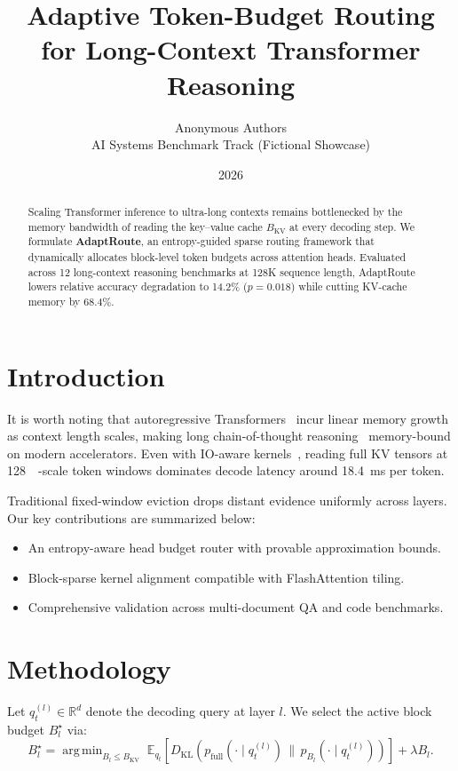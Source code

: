 \documentclass[11pt]{article}
\title{Adaptive Token-Budget Routing for Long-Context Transformer Reasoning}
\author{Anonymous Authors\\AI Systems Benchmark Track (Fictional Showcase)}
\date{2026}
\newcommand{\R}{\mathbb{R}}
\newcommand{\kvbudget}{B_{\mathrm{KV}}}
\newcommand{\argmin}{\operatorname{arg\,min}}
\begin{document}
\maketitle

\begin{abstract}
Scaling Transformer inference to ultra-long contexts remains bottlenecked by the memory bandwidth of reading the key--value cache $\kvbudget$ at every decoding step. We formulate \textbf{AdaptRoute}, an entropy-guided sparse routing framework that dynamically allocates block-level token budgets across attention heads. Evaluated across 12 long-context reasoning benchmarks at 128K sequence length, AdaptRoute lowers relative accuracy degradation to 14.2\% ($p = 0.018$) while cutting KV-cache memory by 68.4\%.
\end{abstract}

\section{Introduction}
\label{sec:intro}

\indent It is worth noting that autoregressive Transformers~\cite{vaswani2017attention} incur linear memory growth as context length scales, making long chain-of-thought reasoning~\cite{wei2022cot} memory-bound on modern accelerators. Even with IO-aware kernels~\cite{dao2022flashattention}, reading full KV tensors at \SI{128}{\kilo\byte}-scale token windows dominates decode latency around \SI{18.4}{\milli\second} per token.

\noindent Traditional fixed-window eviction drops distant evidence uniformly across layers. Our key contributions are summarized below:
\begin{itemize}
  \item An entropy-aware head budget router with provable approximation bounds.
  \item Block-sparse kernel alignment compatible with FlashAttention tiling.
  \item Comprehensive validation across multi-document QA and code benchmarks.
\end{itemize}

\section{Methodology}
\label{sec:method}

Let $q_t^{(l)} \in \R^d$ denote the decoding query at layer $l$. We select the active block budget $B_l^\star$ via:
\begin{equation}
\label{eq:route}
B_l^\star = \argmin_{B_l \le \kvbudget} \; \mathbb{E}_{q_t}\!\left[ D_{\mathrm{KL}}\!\left(p_{\mathrm{full}}(\cdot \mid q_t^{(l)}) \,\|\, p_{B_l}(\cdot \mid q_t^{(l)})\right) \right] + \lambda B_l.
\end{equation}
\end{document}
